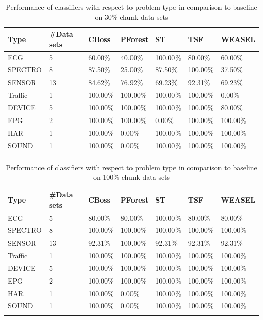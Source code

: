 \begin{table}[hbt!]
	\setlength\extrarowheight{2pt} %
	\begin{tabularx}{\textwidth}{|X|X|X|X|X|X|X|}
	\hline
	\textbf{Type} & \textbf{\#Data sets} & \textbf{CBoss} & \textbf{PForest} & \textbf{ST} & \textbf{TSF} & \textbf{WEASEL} \\ \hline
		ECG & 5 & 60.00\% & 40.00\% & 100.00\% & 80.00\% & 60.00\% \\ \hline
		SPECTRO & 8 &87.50\% & 25.00\% & 87.50\% & 100.00\% & 37.50\% \\ \hline
		SENSOR & 13 & 84.62\% & 76.92\% & 69.23\% & 92.31\% & 69.23\% \\ \hline
		Traffic & 1 & 100.00\% & 100.00\% & 100.00\% & 100.00\% & 0.00\% \\ \hline
		DEVICE & 5 & 100.00\% & 100.00\% & 100.00\% & 100.00\% & 80.00\% \\ \hline
		EPG & 2 & 100.00\% & 100.00\% & 0.00\% & 100.00\% & 100.00\% \\ \hline
		HAR & 1 & 100.00\% & 0.00\% & 100.00\% & 100.00\% & 100.00\% \\ \hline
		SOUND & 1 & 100.00\% & 0.00\% & 100.00\% & 100.00\% & 100.00\% \\ \hline
  \caption{Performance of classifiers with respect to problem type in comparison to baseline on 30\% chunk data sets}
  \label{TableType30}
  \end{tabularx}
\end{table}

\begin{table}[hbt!]
	\setlength\extrarowheight{2pt} %
	\begin{tabularx}{\textwidth}{|X|X|X|X|X|X|X|}
	\hline
	\textbf{Type} & \textbf{\#Data sets} & \textbf{CBoss} & \textbf{PForest} & \textbf{ST} & \textbf{TSF} & \textbf{WEASEL} \\ \hline
		ECG & 5 & 80.00\% & 80.00\% & 100.00\% & 80.00\% & 80.00\% \\ \hline
		SPECTRO & 8 &100.00\% & 100.00\% & 100.00\% & 100.00\% & 100.00\% \\ \hline
		SENSOR & 13 & 92.31\% & 100.00\% & 92.31\% & 92.31\% & 92.31\% \\ \hline
		Traffic & 1 & 100.00\% & 100.00\% & 100.00\% & 100.00\% & 100.00\% \\ \hline
		DEVICE & 5 & 100.00\% & 100.00\% & 100.00\% & 100.00\% & 100.00\% \\ \hline
		EPG & 2 & 100.00\% & 100.00\% & 100.00\% & 100.00\% & 100.00\% \\ \hline
		HAR & 1 & 100.00\% & 0.00\% & 100.00\% & 100.00\% & 100.00\% \\ \hline
		SOUND & 1 & 100.00\% & 0.00\% & 100.00\% & 100.00\% & 100.00\% \\ \hline
  \caption{Performance of classifiers with respect to problem type in comparison to baseline on 100\% chunk data sets}
  \label{TableType100}
  \end{tabularx}
\end{table}

